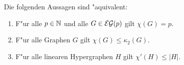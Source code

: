 %
\begin{theorem}
  Die folgenden Aussagen sind "aquivalent:
  \begin{enumerate}[label=(\alph*)]
    \item F"ur alle $p\in{\mathbb{N}}$ und alle $G\in{\cal EG}(p)$ gilt $\chi(G) = p$.
    \item F"ur alle Graphen $G$ gilt $\chi(G) \leq \kappa_{2}(G)$.
    \item F"ur alle linearen Hypergraphen $H$ gilt $\chi'(H) \leq |H|$.
  \end{enumerate}
  \label{thm:equivefl}
\end{theorem}


